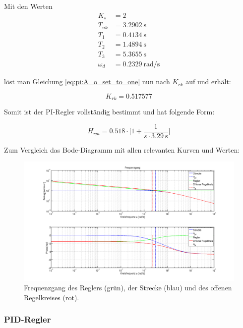 Mit den Werten
\begin{equation} \label{eq:pi:values}
    \begin{split}
        K_s      & = 2                    \\
        T_{nk}   & = \SI{3.2902}{\second} \\
        T_1      & = \SI{0.4134}{\second} \\
        T_2      & = \SI{1.4894}{\second} \\
        T_3      & = \SI{5.3655}{\second} \\
        \omega_d & = \SI{0.2329}{\radian\per\second}
    \end{split}
\end{equation}

l\"ost  man Gleichung  \ref{eq:pi:A_o_set_to_one}  nun nach  $K_{rk}$ auf  und
erh\"alt:

\begin{equation} \label{eq:pi:k_rk_result}
    K_{rk} = 0.517577
\end{equation}

Somit ist der PI-Regler vollst\"andig bestimmt und hat folgende Form:

\begin{equation} \label{eq:pi:result}
    H_{rpi} = 0.518 \cdot \Big[ 1 + \frac{1}{s \cdot \SI{3.29}{\second}} \Big]
\end{equation}

Zum Vergleich das Bode-Diagramm mit allen relevanten Kurven und Werten:
\begin{figure}[h! width=\pagewidth]
    \includegraphics[width=.9\textwidth]{images/piBode.png}
    \caption{%
        Frequenzgang des Reglers (gr\"un), der  Strecke (blau) und des offenen
        Regelkreises (rot).
    }
    \label{fig:pi:all}
\end{figure}

\subsubsection*{PID-Regler}
